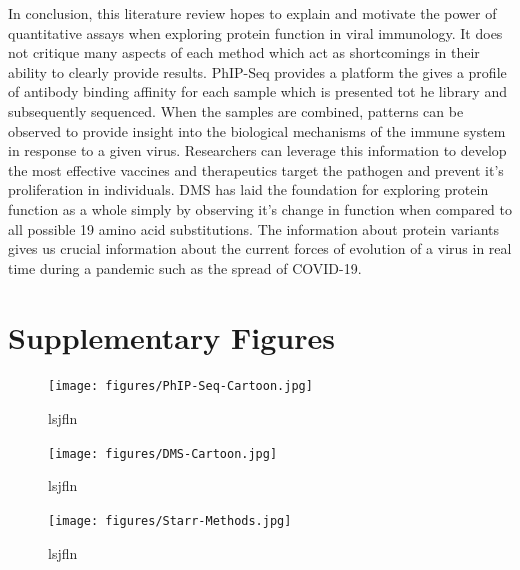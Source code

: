 \documentclass{article}
\begin{document}
In conclusion, this literature review hopes to explain and motivate the power of quantitative assays when exploring protein function in viral immunology.
It does not critique many aspects of each method which act as shortcomings in their ability to clearly provide results.
PhIP-Seq provides a platform the gives a profile of antibody binding affinity for each sample which is presented tot he library and subsequently sequenced.
When the samples are combined, patterns can be observed to provide insight into the biological mechanisms of the immune system in response to a given virus.
Researchers can leverage this information to develop the most effective vaccines and therapeutics target the pathogen and prevent it's proliferation in individuals.
DMS has laid the foundation for exploring protein function as a whole simply by observing it's change in function when compared to all possible 19 amino acid substitutions.
The information about protein variants gives us crucial information about the current forces of evolution of a virus in real time during a pandemic such as the spread of COVID-19.





% 
% 




\section*{Supplementary Figures}

\begin{figure}[h]
\centering
\texttt{[image: figures/PhIP-Seq-Cartoon.jpg]}
\caption{lsjfln}
\label{fig:PhIP-Seq-Cartoon}
\end{figure}

\begin{figure}[h]
\centering
\texttt{[image: figures/DMS-Cartoon.jpg]}
\caption{lsjfln}
\label{fig:DMS-Cartoon}
\end{figure}

\begin{figure}[h]
\centering
\texttt{[image: figures/Starr-Methods.jpg]}
\caption{lsjfln}
\label{fig:Starr-Methods}
\end{figure}
\end{document}
